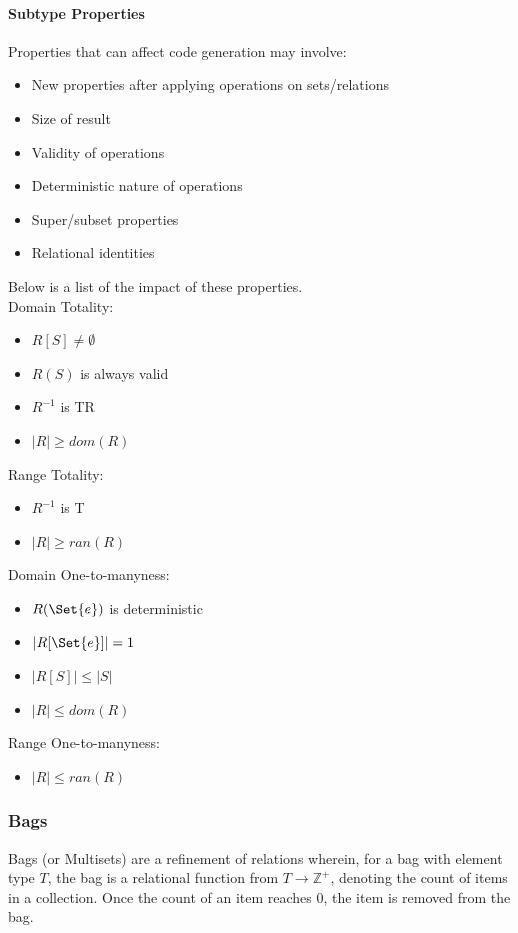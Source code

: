 \paragraph{Subtype Properties}
Properties that can affect code generation may involve:
\begin{itemize}
  \item New properties after applying operations on sets/relations
  \item Size of result
  \item Validity of operations
  \item Deterministic nature of operations
  \item Super/subset properties
  \item Relational identities
\end{itemize}
%
Below is a list of the impact of these properties.
\\
Domain Totality:
\begin{itemize}
  \item $R[S] \neq \emptyset$
  \item $R(S)$ is always valid
  \item $R^{-1}$ is TR
  \item $|R| \geq dom(R)$
\end{itemize}
%
Range Totality:
\begin{itemize}
  \item $R^{-1}$ is T
  \item $|R| \geq ran(R)$
\end{itemize}
%
Domain One-to-manyness:
\begin{itemize}
  \item $R(\Set{e})$ is deterministic
  \item $|R[\Set{e}]| = 1$
  \item $|R[S]| \leq |S|$
  \item $|R| \leq dom(R)$
\end{itemize}
%
Range One-to-manyness:
\begin{itemize}
  \item $|R| \leq ran(R)$
\end{itemize}

\subsubsection{Bags}
Bags (or Multisets) are a refinement of relations wherein, for a bag with element type $T$, the bag is a relational function from $T \rightarrow \mathbb{Z}^+$, denoting the count of items in a collection. Once the count of an item reaches 0, the item is removed from the bag.

